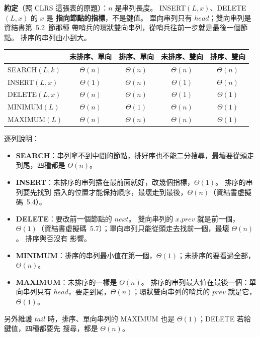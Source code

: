 \begin{pastsoln}
\textbf{約定}（照 CLRS 這張表的原題）：$n$ 是串列長度。 INSERT$(L, x)$、DELETE$(L, x)$ 的 $x$ 是
\textbf{指向節點的指標}，不是鍵值。 單向串列只有 $\mathit{head}$；雙向串列是資結書第~5.2~節那種
帶哨兵的環狀雙向串列，從哨兵往前一步就是最後一個節點。 排序的串列由小到大。

\begin{center}
\small
\begin{tabular}{lcccc}
\toprule
 & 未排序、單向 & 排序、單向 & 未排序、雙向 & 排序、雙向 \\
\midrule
SEARCH$(L, k)$ & $\Theta(n)$ & $\Theta(n)$ & $\Theta(n)$ & $\Theta(n)$ \\
INSERT$(L, x)$ & $\Theta(1)$ & $\Theta(n)$ & $\Theta(1)$ & $\Theta(n)$ \\
DELETE$(L, x)$ & $\Theta(n)$ & $\Theta(n)$ & $\Theta(1)$ & $\Theta(1)$ \\
MINIMUM$(L)$ & $\Theta(n)$ & $\Theta(1)$ & $\Theta(n)$ & $\Theta(1)$ \\
MAXIMUM$(L)$ & $\Theta(n)$ & $\Theta(n)$ & $\Theta(n)$ & $\Theta(1)$ \\
\bottomrule
\end{tabular}
\end{center}

逐列說明：
\begin{itemize}
\item \textbf{SEARCH}：串列拿不到中間的節點，排好序也不能二分搜尋，最壞要從頭走到尾，四種都是
$\Theta(n)$。
\item \textbf{INSERT}：未排序的串列插在最前面就好，改幾個指標，$\Theta(1)$。 排序的串列要先找到
插入的位置才能保持順序，最壞走到最後，$\Theta(n)$（資結書虛擬碼~5.4）。
\item \textbf{DELETE}：要改前一個節點的 $\mathit{next}$。 雙向串列的 $x.\mathit{prev}$ 就是前一個，
$\Theta(1)$（資結書虛擬碼~5.7）；單向串列只能從頭走去找前一個，最壞 $\Theta(n)$。 排序與否沒有
影響。
\item \textbf{MINIMUM}：排序的串列最小值在第一個，$\Theta(1)$；未排序的要看過全部，$\Theta(n)$。
\item \textbf{MAXIMUM}：未排序的一樣是 $\Theta(n)$。 排序的串列最大值在最後一個：單向串列只有
$\mathit{head}$，要走到尾，$\Theta(n)$；環狀雙向串列的哨兵的 $\mathit{prev}$ 就是它，$\Theta(1)$。
\end{itemize}
另外維護 $\mathit{tail}$ 時，排序、單向串列的 MAXIMUM 也是 $\Theta(1)$；DELETE 若給鍵值，四種都要先
搜尋，都是 $\Theta(n)$。
\end{pastsoln}
